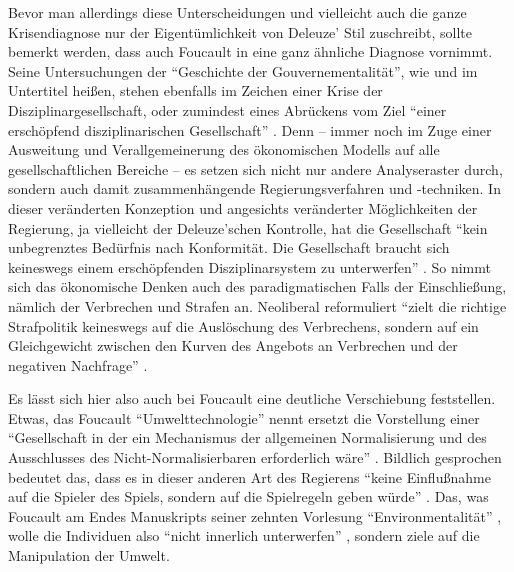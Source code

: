 \documentclass[12pt,
               DIV13,
               paper=a4,
               twoside=false,
               onehalfspacing,
               bibliography=totoc,
               toc=graduated,
               draft,
               ]{scrartcl}
\newcommand{\pc}[2]{\parencite[#1]{#2}}
\begin{document}
Bevor man allerdings diese Unterscheidungen und vielleicht auch die
ganze Krisendiagnose nur der Eigentümlichkeit von Deleuze' Stil
zuschreibt, sollte bemerkt werden, dass auch Foucault in \cite{gbp}
eine ganz ähnliche Diagnose vornimmt. Seine Untersuchungen der
"`Geschichte der Gouvernementalität"', wie \cite{stb} und \cite{gbp}
im Untertitel heißen, stehen ebenfalls im Zeichen einer Krise der
Disziplinargesellschaft, oder zumindest eines Abrückens vom Ziel
"`einer erschöpfend disziplinarischen Gesellschaft"' \pc{359}{gbp}.
Denn -- immer noch im Zuge einer Ausweitung und Verallgemeinerung des
ökonomischen Modells auf alle gesellschaftlichen Bereiche -- es setzen
sich nicht nur andere Analyseraster durch, sondern auch damit
zusammenhängende Regierungsverfahren und -techniken. In dieser
veränderten Konzeption und angesichts veränderter Möglichkeiten der
Regierung, ja vielleicht der Deleuze'schen Kontrolle, hat die
Gesellschaft "`kein unbegrenztes Bedürfnis nach Konformität. Die
Gesellschaft braucht sich keineswegs einem erschöpfenden
Disziplinarsystem zu unterwerfen"' \pc{354}{gbp}. So nimmt sich das
ökonomische Denken auch des paradigmatischen Falls der Einschließung,
nämlich der Verbrechen und Strafen an. Neoliberal reformuliert "`zielt
die richtige Strafpolitik keineswegs auf die Auslöschung des
Verbrechens, sondern auf ein Gleichgewicht zwischen den Kurven des
Angebots an Verbrechen und der negativen Nachfrage"' \pc{354}{gbp}.

Es lässt sich hier also auch bei Foucault eine deutliche Verschiebung
feststellen. Etwas, das Foucault "`Umwelttechnologie"' nennt
\pc{359}{gbp} ersetzt die Vorstellung einer "`Gesellschaft in der ein
Mechanismus der allgemeinen Normalisierung und des Ausschlusses des
Nicht-Normalisierbaren erforderlich wäre"' \pc{359}{gbp}. Bildlich
gesprochen bedeutet das, dass es in dieser anderen Art des Regierens
"`keine Einflußnahme auf die Spieler des Spiels, sondern auf die
Spielregeln geben würde"' \pc{359}{gbp}. Das, was Foucault am Endes
Manuskripts seiner zehnten Vorlesung "`Environmentalität"' \pc{Fn., S.
361}{gbp}, wolle die Individuen also "`nicht innerlich unterwerfen"'
    \pc{359}{gbp}, sondern ziele auf die Manipulation der Umwelt.
\end{document}
